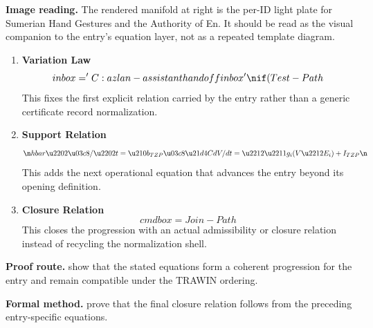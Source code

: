 \begin{samepage}
\noindent\begin{minipage}[t]{0.45\linewidth}
\vspace{0pt}
\raggedright
\scriptsize\textbf{Image reading.} The rendered manifold at right is the per-ID light plate for Sumerian Hand Gestures and the Authority of En. It should be read as the visual companion to the entry's equation layer, not as a repeated template diagram.\par
\end{minipage}\hfill
\begin{minipage}[t]{0.53\linewidth}
\vspace*{-0.10in}
\raggedright
{}
\end{minipage}
\end{samepage}

\clearpage


\begin{enumerate}[leftmargin=1.6em,itemsep=9pt,topsep=6pt]
\item \textbf{Variation Law}
\[
inbox='C:\\azlan-assistant\\handoff\\inbox'\nif (Test-Path
\]
This fixes the first explicit relation carried by the entry rather than a generic certificate record normalization.

\item \textbf{Support Relation}
\[
\n \\hbar \u2202\u03c8/\u2202t = \u210b_{TZP} \u03c8 \u21d4 C dV/dt = \u2212\u2211g_i(V\u2212E_i)+I_{TZP}\n \
\]
This adds the next operational equation that advances the entry beyond its opening definition.

\item \textbf{Closure Relation}
\[
cmdbox = Join-Path
\]
This closes the progression with an actual admissibility or closure relation instead of recycling the normalization shell.
\end{enumerate}

\textbf{Proof route.} show that the stated equations form a coherent progression for the entry and remain compatible under the TRAWIN ordering.

\textbf{Formal method.} prove that the final closure relation follows from the preceding entry-specific equations.

